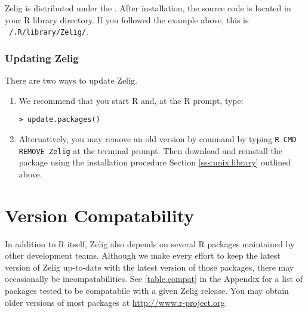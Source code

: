 Zelig is distributed under the .  After
installation, the source code is located in your R library directory.
If you followed the example above, this is {\tt ~/.R/library/Zelig/}.

\subsubsection{Updating Zelig} \label{sss:unix.updating}

There are two ways to update Zelig.  

\begin{enumerate}

\item We recommend that you start R and, at the R prompt, type:
\begin{verbatim}
> update.packages()
\end{verbatim}
  
\item Alternatively, you may remove an old version by command by
  typing {\tt R CMD REMOVE Zelig} at the terminal prompt.  Then
  download and reinstall the package using the installation
  procedure Section \ref{sss:unix.library} outlined above.

\end{enumerate}

\section{Version Compatability}

In addition to R itself, Zelig also depends on several R packages
maintained by other development teams.  Although we make every effort
to keep the latest version of Zelig up-to-date with the latest version
of those packages, there may occasionally be incompatabilities.  See
\ref{table.compat} in the Appendix for a list of packages tested to be
compatabile with a given Zelig release.  You may obtain older versions
of most packages at \url{http://www.r-project.org}.  

